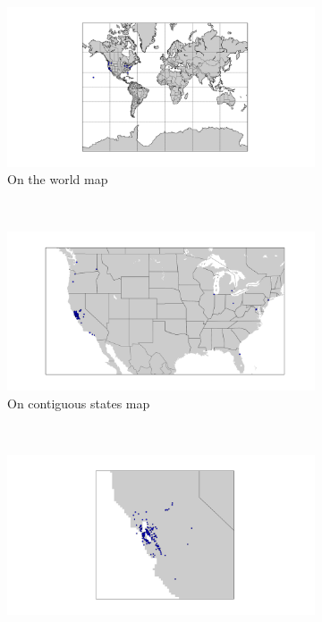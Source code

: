 \documentclass{article}
\begin{document}
\begin{figure}
        \centering
        \begin{subfigure}[b]{0.5\textwidth}
                \includegraphics[width=\textwidth]{../home_zips_world.png}
                \caption{On the world map}
                \label{fig:homezips:world}
        \end{subfigure}%
        ~ %
        \begin{subfigure}[b]{0.5\textwidth}
                \includegraphics[width=\textwidth]{../home_zips_usa.png}
                \caption{On contiguous states map}
                \label{fig:homezips:usa}
        \end{subfigure}
        ~ %
        \begin{subfigure}[b]{0.4\textwidth}
                \includegraphics[width=\textwidth]{../home_zips_norcal.png}

\end{subfigure}
\end{figure}
\end{document}
